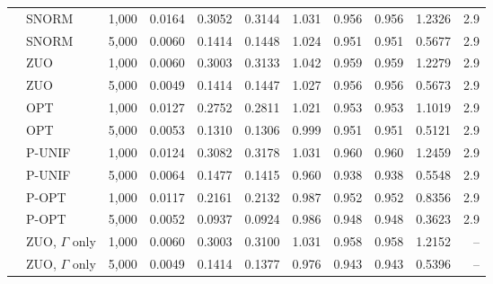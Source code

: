 \begin{tabular}{llrrrrrrrrr}
 & SNORM & 1,000 & 0.0164 & 0.3052 & 0.3144 & 1.031 & 0.956 & 0.956 & 1.2326 & 2.9\\
 & SNORM & 5,000 & 0.0060 & 0.1414 & 0.1448 & 1.024 & 0.951 & 0.951 & 0.5677 & 2.9\\
 & ZUO & 1,000 & 0.0060 & 0.3003 & 0.3133 & 1.042 & 0.959 & 0.959 & 1.2279 & 2.9\\
 & ZUO & 5,000 & 0.0049 & 0.1414 & 0.1447 & 1.027 & 0.956 & 0.956 & 0.5673 & 2.9\\
 & OPT & 1,000 & 0.0127 & 0.2752 & 0.2811 & 1.021 & 0.953 & 0.953 & 1.1019 & 2.9\\
 & OPT & 5,000 & 0.0053 & 0.1310 & 0.1306 & 0.999 & 0.951 & 0.951 & 0.5121 & 2.9\\
 & P-UNIF & 1,000 & 0.0124 & 0.3082 & 0.3178 & 1.031 & 0.960 & 0.960 & 1.2459 & 2.9\\
 & P-UNIF & 5,000 & 0.0064 & 0.1477 & 0.1415 & 0.960 & 0.938 & 0.938 & 0.5548 & 2.9\\
 & P-OPT & 1,000 & 0.0117 & 0.2161 & 0.2132 & 0.987 & 0.952 & 0.952 & 0.8356 & 2.9\\
 & P-OPT & 5,000 & 0.0052 & 0.0937 & 0.0924 & 0.986 & 0.948 & 0.948 & 0.3623 & 2.9\\
 & ZUO, \(\Gamma\) only & 1,000 & 0.0060 & 0.3003 & 0.3100 & 1.031 & 0.958 & 0.958 & 1.2152 & --\\
 & ZUO, \(\Gamma\) only & 5,000 & 0.0049 & 0.1414 & 0.1377 & 0.976 & 0.943 & 0.943 & 0.5396 & --\\
\bottomrule
\end{tabular}
